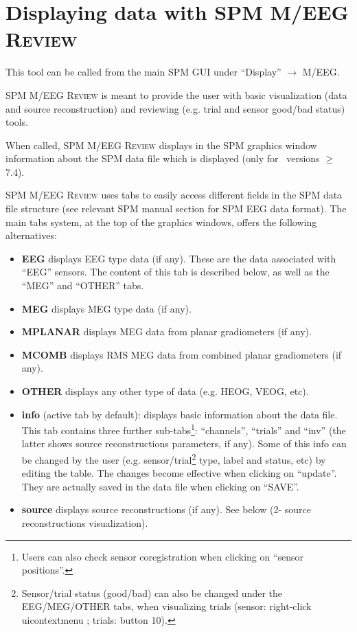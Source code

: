 \section{Displaying data with SPM M/EEG \textsc{Review}}
This tool can be called from the main SPM GUI under ``Display'' $\rightarrow$ M/EEG.

SPM M/EEG \textsc{Review} is meant to provide the user with basic visualization (data and source reconstruction) and reviewing (e.g. trial and sensor good/bad status) tools.

When called, SPM M/EEG \textsc{Review} displays in the SPM graphics window information about the SPM data file which is displayed (only for \matlab\ versions $\geq$ 7.4).

SPM M/EEG \textsc{Review} uses tabs to easily access different fields in the SPM data file structure (see relevant SPM manual section for SPM EEG data format). The main tabs system, at the top of the graphics windows, offers the following alternatives:

\begin{itemize}

\item{\textbf{EEG}} displays EEG type data (if any). These are the data associated with ``EEG'' sensors. The content of this tab is described below, as well as the ``MEG'' and ``OTHER'' tabs.

\item{\textbf{MEG}} displays MEG type data (if any).

\item{\textbf{MPLANAR}} displays MEG data from planar gradiometers (if any).

\item{\textbf{MCOMB}} displays RMS MEG data from combined planar gradiometers (if any).

\item{\textbf{OTHER}} displays any other type of data (e.g. HEOG, VEOG, etc).

\item{\textbf{info}}
(active tab by default): displays basic information about the data file. This tab contains three further sub-tabs\footnote{Users can also check sensor coregistration when clicking on ``sensor positions''.}: ``channels'', ``trials'' and ``inv'' (the latter shows source reconstructions parameters, if any). Some of this info can be changed by the user (e.g. sensor/trial\footnote{Sensor/trial status (good/bad) can also be changed under the EEG/MEG/OTHER tabs, when visualizing trials (sensor: right-click uicontextmenu ; trials: button 10).}  type, label and status, etc) by editing the table. The changes become effective when clicking on ``update''. They are actually saved in the data file when clicking on ``SAVE''.

\item{\textbf{source}}
displays source reconstructions (if any). See below (2- source reconstructions visualization).

\end{itemize}

